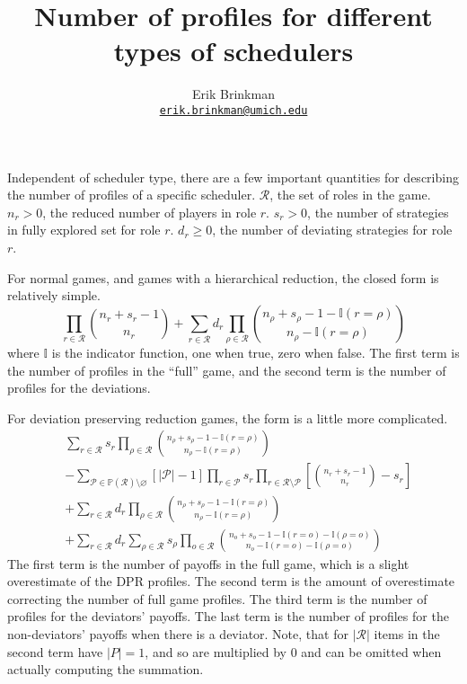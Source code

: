 \documentclass{article}
\begin{document}
\title{Number of profiles for different types of schedulers}
\author{Erik Brinkman\\\texttt{\href{mailto:erik.brinkman@umich.edu}{erik.brinkman@umich.edu}}}
\maketitle

Independent of scheduler type, there are a few important quantities for describing the number of profiles of a specific scheduler.
$\mathcal R$, the set of roles in the game.
$n_r > 0$, the reduced number of players in role $r$.
$s_r > 0$, the number of strategies in fully explored set for role $r$.
$d_r \ge 0$, the number of deviating strategies for role $r$.

For normal games, and games with a hierarchical reduction, the closed form is relatively simple.
\begin{equation*}
    \prod_{r \in \mathcal R} {n_r + s_r - 1 \choose n_r} + \sum_{r \in \mathcal R} d_r \prod_{\rho \in \mathcal R} {n_\rho + s_\rho - 1 - \mathbb{I}(r = \rho) \choose n_\rho - \mathbb{I}(r = \rho)}
\end{equation*}
where $\mathbb{I}$ is the indicator function, one when true, zero when false. The first term is the number of profiles in the ``full'' game, and the second term is the number of profiles for the deviations.

For deviation preserving reduction games, the form is a little more complicated.
\begin{equation*}
    \begin{split}
        & \sum_{r \in \mathcal R} s_r \prod_{\rho \in \mathcal R} {n_\rho + s_\rho - 1 - \mathbb{I}(r = \rho) \choose n_\rho - \mathbb{I}(r = \rho)} \\
        & - \sum_{\mathcal P \in \mathbb P(\mathcal R) \setminus \varnothing} \left[ |\mathcal P| - 1 \right] \prod_{r \in \mathcal P} s_r \prod_{r \in \mathcal R \setminus \mathcal P} \left[ {n_r + s_r - 1 \choose n_r} - s_r \right] \\
        & + \sum_{r \in \mathcal R} d_r \prod_{\rho \in \mathcal R} {n_\rho + s_\rho - 1 - \mathbb{I}(r = \rho) \choose n_\rho - \mathbb{I}(r = \rho)} \\
        & + \sum_{r \in \mathcal R} d_r \sum_{\rho \in \mathcal R} s_\rho \prod_{o \in \mathcal R} {n_o + s_o - 1 - \mathbb{I}(r = o) - \mathbb{I}(\rho = o) \choose n_o - \mathbb{I}(r = o) - \mathbb{I}(\rho = o)}
    \end{split}
\end{equation*}
The first term is the number of payoffs in the full game, which is a slight overestimate of the DPR profiles.
The second term is the amount of overestimate correcting the number of full game profiles.
The third term is the number of profiles for the deviators' payoffs.
The last term is the number of profiles for the non-deviators' payoffs when there is a deviator.
Note, that for $|\mathcal R|$ items in the second term have $|P| = 1$, and so are multiplied by 0 and can be omitted when actually computing the summation.
\end{document}

